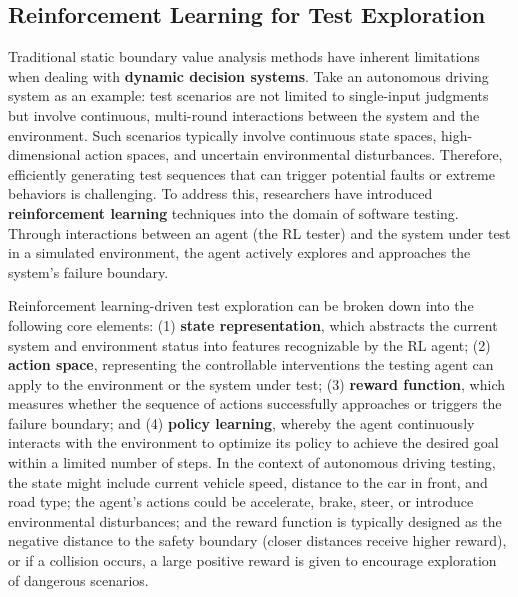 \documentclass[manuscript,screen,review]{acmart}
\begin{document}
\subsection{Reinforcement Learning for Test Exploration}
Traditional static boundary value analysis methods have inherent limitations when dealing with \textbf{dynamic decision systems}. Take an autonomous driving system as an example: test scenarios are not limited to single-input judgments but involve continuous, multi-round interactions between the system and the environment. Such scenarios typically involve continuous state spaces, high-dimensional action spaces, and uncertain environmental disturbances. Therefore, efficiently generating test sequences that can trigger potential faults or extreme behaviors is challenging. To address this, researchers have introduced \textbf{reinforcement learning} techniques into the domain of software testing. Through interactions between an agent (the RL tester) and the system under test in a simulated environment, the agent actively explores and approaches the system’s failure boundary.

Reinforcement learning-driven test exploration can be broken down into the following core elements: (1) \textbf{state representation}, which abstracts the current system and environment status into features recognizable by the RL agent; (2) \textbf{action space}, representing the controllable interventions the testing agent can apply to the environment or the system under test; (3) \textbf{reward function}, which measures whether the sequence of actions successfully approaches or triggers the failure boundary; and (4) \textbf{policy learning}, whereby the agent continuously interacts with the environment to optimize its policy to achieve the desired goal within a limited number of steps. In the context of autonomous driving testing, the state might include current vehicle speed, distance to the car in front, and road type; the agent’s actions could be accelerate, brake, steer, or introduce environmental disturbances; and the reward function is typically designed as the negative distance to the safety boundary (closer distances receive higher reward), or if a collision occurs, a large positive reward is given to encourage exploration of dangerous scenarios.
\end{document}

